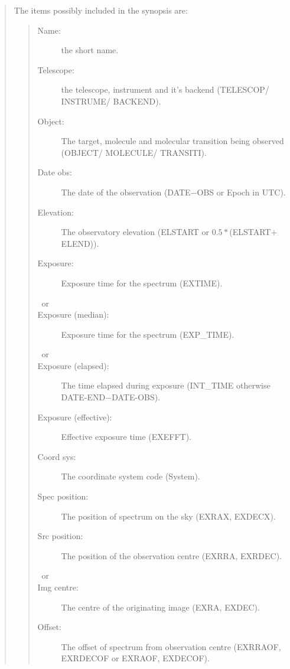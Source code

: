 \documentclass[twoside,11pt,nolof]{starlink}
\begin{document}
\begin{quote}
\begin{itemize}
  The items possibly included in the synopsis are:
  \begin{quote}
  \begin{description}
     \item[Name:] the short name.
     \item[Telescope:] the telescope, instrument and it's backend (TELESCOP/ INSTRUME/ BACKEND).
     \item[Object:] The target, molecule and molecular transition being observed (OBJECT/ MOLECULE/ TRANSITI).
     \item[Date obs:] The date of the observation (DATE$-$OBS or Epoch in UTC).
     \item[Elevation:] The observatory elevation (ELSTART or $0.5*$(ELSTART$+$ELEND)).
     \item[Exposure:] Exposure time for the spectrum (EXTIME).
     \item[~or]
     \item[Exposure (median):] Exposure time for the spectrum (EXP\_TIME).
     \item[~or]
     \item[Exposure (elapsed):] The time elapsed during exposure (INT\_TIME otherwise DATE-END$-$DATE-OBS).
     \item[Exposure (effective):] Effective exposure time (EXEFFT).
     \item[Coord sys:] The coordinate system code (System).

     \item[Spec position:] The position of spectrum on the sky (EXRAX, EXDECX).
     \item[Src position:] The position of the observation centre (EXRRA, EXRDEC).
     \item[~or]
     \item[Img centre:] The centre of the originating image (EXRA, EXDEC).
     \item[Offset:] The offset of spectrum from observation centre (EXRRAOF, EXRDECOF or EXRAOF, EXDECOF).


\end{description}
\end{quote}
\end{itemize}
\end{quote}
\end{document}
